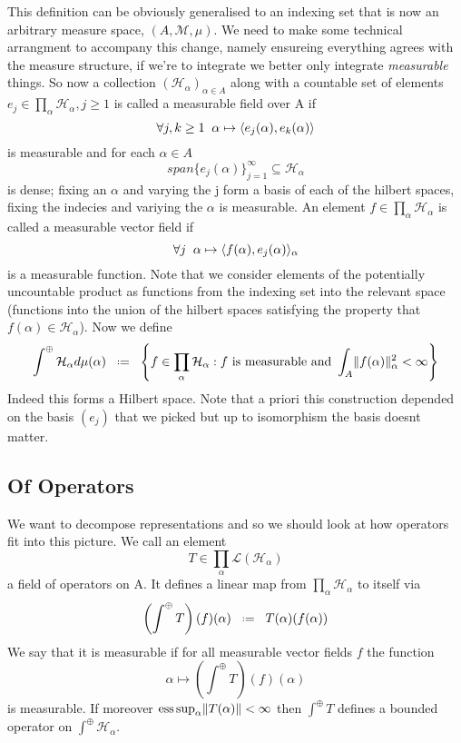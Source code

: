 \documentclass[12pt, openany]{book}
\numberwithin{equation}{section}
\theoremstyle{definition}
\theoremstyle{remark}
\numberwithin{equation}{section}
\begin{document}
    This definition can be obviously generalised to an indexing set that is now an arbitrary measure space, \((A, \mathcal{M}, \mu)\). We need to make some technical arrangment to accompany this change, namely ensureing everything agrees with the measure structure, if we're to integrate we better only integrate \textit{measurable} things. So now a collection \((\mathcal{H}_\alpha)_{\alpha\in A}\) along with a countable set of elements \(e_j \in \prod_\alpha \mathcal{H}_\alpha, j\geq 1\) is called a measurable field over A if 
    \[\forall j,k\geq 1 \;\; \alpha \mapsto \langle e_j(\alpha), e_k(\alpha)\rangle\]
    is measurable and for each \(\alpha \in A\) 
    \[span\{e_j(\alpha)\}_{j=1}^\infty \subseteq \mathcal{H}_\alpha\]
    is dense; fixing an \(\alpha\) and varying the j form a basis of each of the hilbert spaces, fixing the indecies and variying the \(\alpha\) is measurable. An element \(f \in \prod_\alpha \mathcal{H}_\alpha\) is called a measurable vector field if 
    \[\forall j \;\; \alpha \mapsto \langle f(\alpha), e_j(\alpha)\rangle_\alpha\]
    is a measurable function. Note that we consider elements of the potentially uncountable product as functions from the indexing set into the relevant space (functions into the union of the hilbert spaces satisfying the property that \(f(\alpha)\in \mathcal{H}_\alpha\)). Now we define 
    \[\int^\oplus \mathcal{H}_\alpha d\mu(\alpha) \defeq \left\{f\in \prod_\alpha \mathcal{H}_\alpha : f \text{ is measurable and } \int_A \norm{f(\alpha)}_\alpha^2 < \infty \right\}\] 
    Indeed this forms a Hilbert space. Note that a priori this construction depended on the basis \((e_j)\) that we picked but up to isomorphism the basis doesnt matter. 

    \subsection{Of Operators}
    We want to decompose representations and so we should look at how operators fit into this picture. We call an element 
    \[T\in \prod_\alpha \mathcal{L(H_\alpha)}\]
    a field of operators on A. It defines a linear map from \(\prod_\alpha \mathcal{H}_\alpha\) to itself via 
    \[ \left(\int^\oplus T\right)(f)(\alpha) \defeq T(\alpha)(f(\alpha)) \]
    We say that it is measurable if for all measurable vector fields \(f\) the function 
    \[\alpha \mapsto \left(\int^\oplus T\right)(f)(\alpha)\]
    is measurable. If moreover \(\mathrm{ess}\sup_\alpha \lVert T(\alpha) \rVert <\infty\) then \(\int^\oplus T\) defines a bounded operator on \(\int^\oplus \mathcal{H}_\alpha\).
\end{document}
